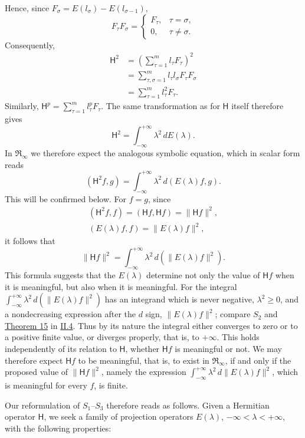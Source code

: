 \documentclass[fontsize=13pt,twoside,openany,headings=normal,parskip=false,bookmarkpackage=false,DIV=calc]{scrbook}
\begin{document}
\hypertarget{origpage-61}{}%
Hence, since $F_\sigma=E(l_\sigma)-E(l_{\sigma-1})$,
\[
F_\tau F_\sigma=\begin{cases}F_\tau,&\tau=\sigma,\\0,&\tau\ne\sigma.\end{cases}
\]
Consequently,
\begin{align*}
\mathsf H^2&=\left(\sum_{\tau=1}^m l_\tau F_\tau\right)^2\\
&=\sum_{\tau,\sigma=1}^m l_\tau l_\sigma F_\tau F_\sigma\\
&=\sum_{\tau=1}^m l_\tau^2F_\tau.
\end{align*}
Similarly, $\mathsf H^p=\sum_{\tau=1}^m l_\tau^pF_\tau$. The same transformation as for $\mathsf H$ itself therefore gives
\[
\mathsf H^2=\int_{-\infty}^{+\infty}\lambda^2\,dE(\lambda).
\]
In $\mathfrak{R}_\infty$ we therefore expect the analogous symbolic equation, which in scalar form reads
\[
(\mathsf H^2f,g)=\int_{-\infty}^{+\infty}\lambda^2\,d(E(\lambda)f,g).
\]
This will be confirmed below. For $f=g$, since
\begin{gather*}
(\mathsf H^2f,f)=(\mathsf Hf,\mathsf Hf)=\|\mathsf Hf\|^2,\\
(E(\lambda)f,f)=\|E(\lambda)f\|^2,
\end{gather*}
it follows that
\[
\|\mathsf Hf\|^2=\int_{-\infty}^{+\infty}\lambda^2\,d(\|E(\lambda)f\|^2).
\]
This formula suggests that the $E(\lambda)$ determine not only the value of $\mathsf Hf$ when it is meaningful, but also when it is meaningful. For the integral $\int_{-\infty}^{+\infty}\lambda^2\,d(\|E(\lambda)f\|^2)$ has an integrand which is never negative, $\lambda^2\geq0$, and a nondecreasing expression after the $d$ sign, $\|E(\lambda)f\|^2$; compare $\hyperref[cond:II.S2]{S_2}$ and \hyperref[thm:II.15]{Theorem 15} in \hyperref[sec:II.4]{II.4}. Thus by its nature the integral either converges to zero or to a positive finite value, or diverges properly, that is, to $+\infty$. This holds independently of its relation to $\mathsf H$, whether $\mathsf Hf$ is meaningful or not. We may therefore expect $\mathsf Hf$ to be meaningful, that is, to exist in $\mathfrak{R}_\infty$, if and only if the proposed value of $\|\mathsf Hf\|^2$, namely the expression $\int_{-\infty}^{+\infty}\lambda^2\,d\|E(\lambda)f\|^2$, which is meaningful for every $f$, is finite.

Our reformulation of $\hyperref[cond:II.S1]{S_1}$--$\hyperref[cond:II.S3]{S_3}$ therefore reads as follows. Given a Hermitian operator $\mathsf H$, we seek a family of projection operators $E(\lambda)$, $-\infty<\lambda<+\infty$, with the following properties:
\end{document}
